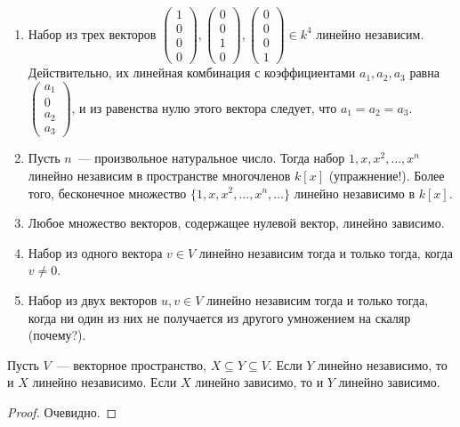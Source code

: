 \begin{examples}
\begin{enumerate}
\item Набор из трех векторов
$\begin{pmatrix}1 \\ 0 \\ 0 \\ 0\end{pmatrix},
\begin{pmatrix}0 \\ 0 \\ 1 \\ 0\end{pmatrix},
\begin{pmatrix}0 \\ 0 \\ 0 \\ 1\end{pmatrix} \in k^4$
линейно независим. Действительно, их линейная комбинация с коэффициентами
$a_1,a_2,a_3$ равна $\begin{pmatrix} a_1 \\ 0 \\ a_2 \\ a_3\end{pmatrix}$,
и из равенства нулю этого вектора следует, что $a_1 = a_2 = a_3$.
\item Пусть $n$~--- произвольное натуральное число.
Тогда набор $1,x,x^2,\dots,x^n$ линейно независим в пространстве
многочленов $k[x]$ (упражнение!). Более того, бесконечное множество
$\{1,x,x^2,\dots,x^n,\dots\}$ линейно независимо в $k[x]$.
\item Любое множество векторов, содержащее нулевой вектор, линейно зависимо.
\item Набор из одного вектора $v\in V$ линейно независим тогда и только тогда,
когда $v\neq 0$.
\item Набор из двух векторов $u,v\in V$ линейно независим тогда и только тогда,
когда ни один из них не получается из другого умножением на скаляр
(почему?).
\end{enumerate}
\end{examples}

\begin{lemma}\label{lemma_lnz_lz_up_down}
Пусть $V$~--- векторное пространство, $X\subseteq Y\subseteq V$. Если
$Y$ линейно независимо, то и $X$ линейно независимо. Если $X$ линейно
зависимо, то и $Y$ линейно зависимо.
\end{lemma}
\begin{proof}
Очевидно.
\end{proof}

